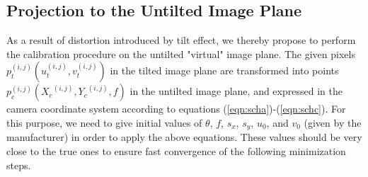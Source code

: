 \documentclass[12pt]{article}
\begin{document}
\subsection{Projection to the Untilted Image Plane}
As a result of distortion introduced by tilt effect, we thereby propose to perform the calibration procedure on the untilted "virtual" image plane. The given pixels ${p}_t^{(i,j)}({u}_t^{(i,j)},{v}_t^{(i,j)})$ in the tilted image plane are transformed into  points ${p}_c^{(i,j)} ({X_c}^{(i,j)},{Y_c}^{(i,j)},f)$ in the untilted image plane, and expressed in the camera coordinate system according to equations (\ref{eqn:scha})-(\ref{eqn:schc}).  For this purpose, we need to give initial values of  $\theta$, $f$,  $s_x$, $s_y$,  $u_0$, and $v_0$ (given by the manufacturer) in order to apply the above equations. These values should be very close to the true ones to ensure fast convergence of the following minimization steps. 
\end{document}
